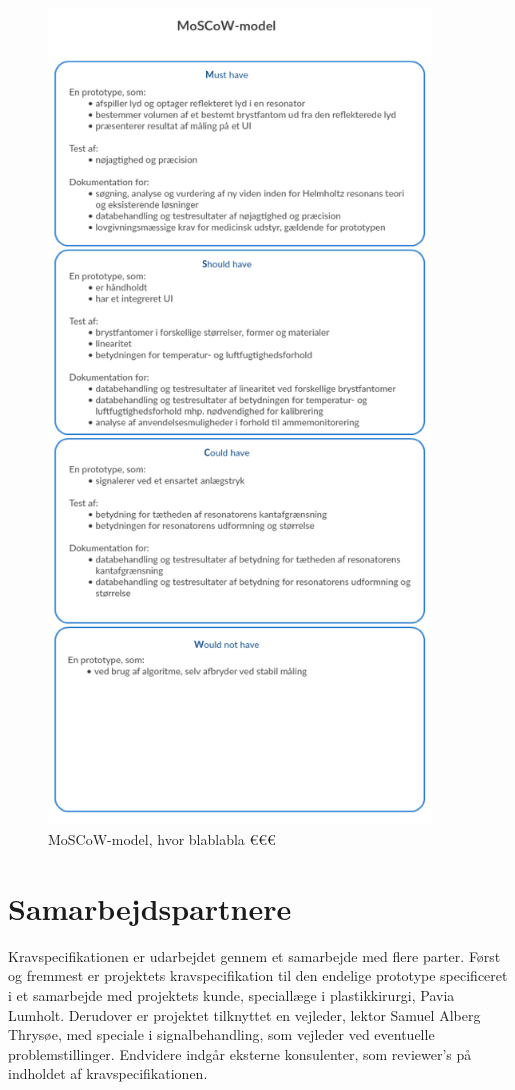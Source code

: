 	\begin{figure}[htb]
				\centering
					\includegraphics[width=4in]{MoSCoWv02}
					\caption{MoSCoW-model, hvor blablabla €€€}
					\label{fig:MoSCoW}
	\end{figure}	
		
	\section{Samarbejdspartnere}	 
	Kravspecifikationen er udarbejdet gennem et samarbejde med flere parter. 
	Først og fremmest er projektets kravspecifikation til den endelige prototype specificeret i et samarbejde med projektets kunde, speciallæge i plastikkirurgi, Pavia Lumholt.  
	Derudover er projektet tilknyttet en vejleder, lektor Samuel Alberg Thrysøe, med speciale i signalbehandling, som vejleder ved eventuelle problemstillinger.  
	Endvidere indgår eksterne konsulenter, som reviewer's på indholdet af kravspecifikationen.   
 	
  
 